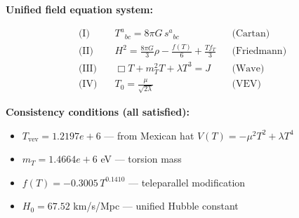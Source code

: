 
\textbf{Unified field equation system:}

\begin{align}
  \text{(I)} \quad & T^a{}_{bc} = 8\pi G \, s^a{}_{bc} && \text{(Cartan)} \\
  \text{(II)} \quad & H^2 = \frac{8\pi G}{3}\rho - \frac{f(T)}{6} + \frac{Tf_T}{3} && \text{(Friedmann)} \\
  \text{(III)} \quad & \Box T + m_T^2 T + \lambda T^3 = J && \text{(Wave)} \\
  \text{(IV)} \quad & T_0 = \frac{\mu}{\sqrt{2\lambda}} && \text{(VEV)}
\end{align}

\textbf{Consistency conditions (all satisfied):}
\begin{itemize}
  \item $T_{\text{vev}} = 1.2197e+6$ — from Mexican hat $V(T) = -\mu^2 T^2 + \lambda T^4$
  \item $m_T = 1.4664e+6$ eV — torsion mass
  \item $f(T) = -0.3005 \, T^{0.1410}$ — teleparallel modification
  \item $H_0 = 67.52$ km/s/Mpc — unified Hubble constant
\end{itemize}